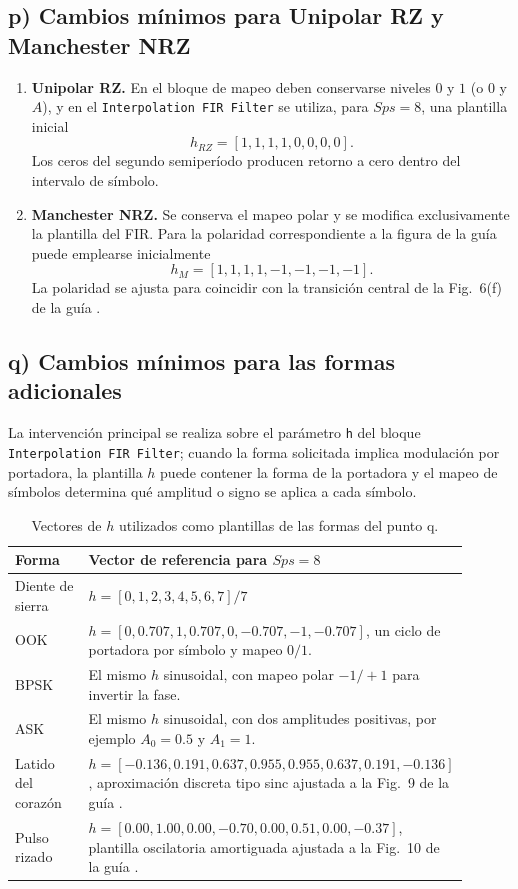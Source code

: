 \documentclass[journal]{IEEEtran}
\begin{document}
\subsection{p) Cambios mínimos para Unipolar RZ y Manchester NRZ}
\begin{enumerate}[leftmargin=*]
\item \textbf{Unipolar RZ.} En el bloque de mapeo deben conservarse niveles $0$ y $1$ (o $0$ y $A$), y en el \texttt{Interpolation FIR Filter} se utiliza, para $Sps=8$, una plantilla inicial
\begin{equation}
h_{RZ}=[1,1,1,1,0,0,0,0].
\end{equation}
Los ceros del segundo semiperíodo producen retorno a cero dentro del intervalo de símbolo.
\item \textbf{Manchester NRZ.} Se conserva el mapeo polar y se modifica exclusivamente la plantilla del FIR. Para la polaridad correspondiente a la figura de la guía puede emplearse inicialmente
\begin{equation}
h_M=[1,1,1,1,-1,-1,-1,-1].
\end{equation}
La polaridad se ajusta para coincidir con la transición central de la Fig.~6(f) de la guía \cite{GuiaLab3}.
\end{enumerate}

\subsection{q) Cambios mínimos para las formas adicionales}
La intervención principal se realiza sobre el parámetro \texttt{h} del bloque \texttt{Interpolation FIR Filter}; cuando la forma solicitada implica modulación por portadora, la plantilla $h$ puede contener la forma de la portadora y el mapeo de símbolos determina qué amplitud o signo se aplica a cada símbolo.

\begin{table}[htbp]
\centering
\caption{Vectores de $h$ utilizados como plantillas de las formas del punto q.}
\label{tab:q}
\begin{tabular}{p{0.20\linewidth}p{0.70\linewidth}}
\toprule
Forma & Vector de referencia para $Sps=8$ \\
\midrule
Diente de sierra & $h=[0,1,2,3,4,5,6,7]/7$ \\
OOK & $h=[0,0.707,1,0.707,0,-0.707,-1,-0.707]$, un ciclo de portadora por símbolo y mapeo $0/1$. \\
BPSK & El mismo $h$ sinusoidal, con mapeo polar $-1/+1$ para invertir la fase. \\
ASK & El mismo $h$ sinusoidal, con dos amplitudes positivas, por ejemplo $A_0=0.5$ y $A_1=1$. \\
Latido del corazón & $h=[-0.136,0.191,0.637,0.955,0.955,0.637,0.191,-0.136]$, aproximación discreta tipo sinc ajustada a la Fig.~9 de la guía \cite{GuiaLab3}. \\
Pulso rizado & $h=[0.00,1.00,0.00,-0.70,0.00,0.51,0.00,-0.37]$, plantilla oscilatoria amortiguada ajustada a la Fig.~10 de la guía \cite{GuiaLab3}. \\
\bottomrule
\end{tabular}
\end{table}
\end{document}
